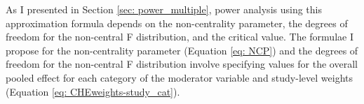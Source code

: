 




As I presented in Section \ref{sec: power_multiple}, power analysis using this approximation formula depends on the non-centrality parameter, the degrees of freedom for the non-central F distribution, and the critical value. The formulae I propose for the non-centrality parameter (Equation \ref{eq: NCP}) and the degrees of freedom for the non-central F distribution involve specifying values for the overall pooled effect for each category of the moderator variable and study-level weights (Equation \ref{eq: CHEweights-study_cat}). 

